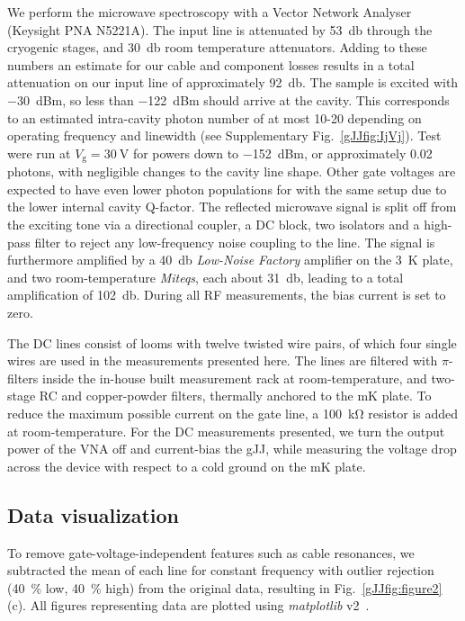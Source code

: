 We perform the microwave spectroscopy with a Vector Network Analyser (Keysight PNA N5221A).
The input line is attenuated by \SI{53}{\decibel} through the cryogenic stages, and \SI{30}{\decibel} room temperature attenuators.
Adding to these numbers an estimate for our cable and component losses results in a total attenuation on our input line of approximately \SI{92}{\decibel}.
The sample is excited with \SI{-30}{dBm}, so less than \SI{-122}{dBm} should arrive at the cavity.
This corresponds to an estimated intra-cavity photon number of at most 10-20 depending on operating frequency and linewidth (see Supplementary Fig.~\ref{gJJfig:IjVj}).
Test were run at $V_\text{g} = \SI{30}{\volt}$ for powers down to \SI{-152}{dBm}, or approximately 0.02 photons, with negligible changes to the cavity line shape.
Other gate voltages are expected to have even lower photon populations for with the same setup due to the lower internal cavity Q-factor.
The reflected microwave signal is split off from the exciting tone via a directional coupler, a DC block, two isolators and a high-pass filter to reject any low-frequency noise coupling to the line.
The signal is furthermore amplified by a \SI{40}{\decibel} \textit{Low-Noise Factory} amplifier on the \SI{3}{\kelvin} plate, and two room-temperature \textit{Miteqs}, each about \SI{31}{\decibel}, leading to a total amplification of \SI{102}{\decibel}.
During all RF measurements, the bias current is set to zero.

The DC lines consist of looms with twelve twisted wire pairs, of which four single wires are used in the measurements presented here.
The lines are filtered with $\pi$-filters inside the in-house built measurement rack at room-temperature, and two-stage RC and copper-powder filters, thermally anchored to the mK plate.
To reduce the maximum possible current on the gate line, a \SI{100}{\kilo\ohm} resistor is added at room-temperature.
For the DC measurements presented, we turn the output power of the VNA off and current-bias the gJJ, while measuring the voltage drop across the device with respect to a cold ground on the mK plate.

\subsection{Data visualization}
To remove gate-voltage-independent features such as cable resonances, we subtracted the mean of each line for constant frequency with outlier rejection (\SI{40}{\percent} low, \SI{40}{\percent} high) from the original data, resulting in Fig.~\ref{gJJfig:figure2}(c).
All figures representing data are plotted using \textit{matplotlib} v2~\cite{hunterMatplotlib2DGraphics2007}.

